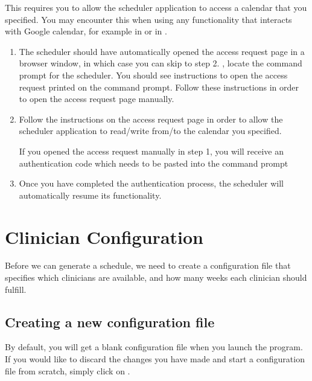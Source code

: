 \documentclass[letterpaper,10pt,english]{sphinxmanual}
\begin{document}
This requires you to allow the scheduler application to access a calendar
that you specified. You may encounter this when using any functionality that
interacts with Google calendar, for example in {\hyperref[\detokenize{index:generating-a-schedule}]{}}
or in {\hyperref[\detokenize{index:publishing-a-schedule-to-google-calendar}]{}}.
\begin{enumerate}
\item {} 
The scheduler should have automatically opened the access request page
in a browser window, in which case you can skip to step 2. ,
locate the command prompt for the scheduler. You should see instructions
to open the access request printed on the command prompt. Follow these instructions
in order to open the access request page manually.

\end{enumerate}
\begin{enumerate}
\setcounter{enumi}{1}
\item {} 
Follow the instructions on the access request page in order to allow
the scheduler application to read/write from/to the calendar you specified.

 If you opened the access request manually in step 1, you will
receive an authentication code which needs to be pasted into the command prompt

\end{enumerate}
\begin{enumerate}
\setcounter{enumi}{2}
\item {} 
Once you have completed the authentication process, the scheduler will
automatically resume its functionality.

\end{enumerate}


\section{Clinician Configuration}
\label{\detokenize{index:clinician-configuration}}\label{\detokenize{index:id3}}
Before we can generate a schedule, we need to create a configuration file
that specifies which clinicians are available, and how many weeks each
clinician should fulfill.


\subsection{Creating a new configuration file}
\label{\detokenize{index:creating-a-new-configuration-file}}
By default, you will get a blank configuration file when you launch
the program. If you would like to discard the changes you have made and
start a configuration file from scratch, simply click on .
\end{document}
